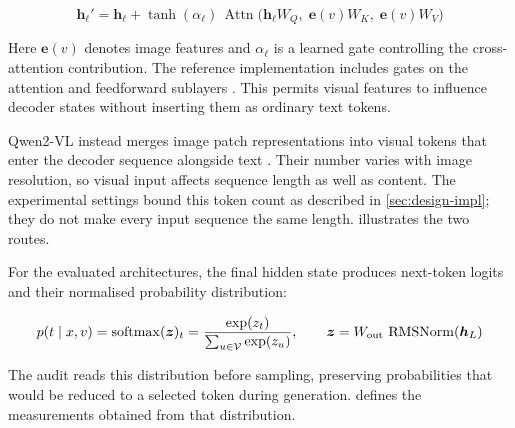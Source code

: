 \begin{equation}
  \bm h_\ell' = \bm h_\ell + \tanh(\alpha_\ell)\,
  \operatorname{Attn}\!\big(\bm h_\ell W_Q,\; \bm e(v) W_K,\; \bm e(v) W_V\big)
  \label{eq:crossattn}
\end{equation}

Here $\bm e(v)$ denotes image features and $\alpha_\ell$ is a learned gate
controlling the cross-attention contribution. The reference implementation
includes gates on the attention and feedforward sublayers
\cite{wolf2020transformers}. This permits visual features to influence
decoder states without inserting them as ordinary text tokens.

Qwen2-VL instead merges image patch representations into visual tokens
that enter the decoder sequence alongside text \cite{wang2024qwen2vl}.
Their number varies with image resolution, so visual input affects sequence
length as well as content. The experimental settings bound this token count
as described in \cref{sec:design-impl}; they do not make every input
sequence the same length.  illustrates the two routes.

For the evaluated architectures, the final hidden state produces next-token
logits and their normalised probability distribution:

\begin{equation}
  p(t \mid x, v) = \operatorname{softmax}(\bm z)_t = \frac{\exp(z_t)}{\sum_{u\in\mathcal{V}}\exp(z_u)},
  \qquad \bm z = W_{\text{out}}\,\operatorname{RMSNorm}(\bm h_L)
  \label{eq:nexttoken}
\end{equation}

The audit reads this distribution before sampling, preserving probabilities
that would be reduced to a selected token during generation.
 defines the measurements obtained from that distribution.

